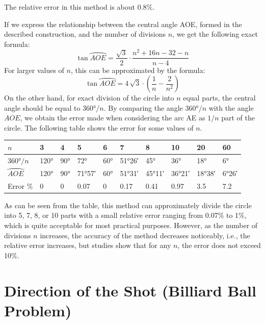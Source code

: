 The relative error in this method is about 0.8\%.


If we express the relationship between the central angle AOE, formed in the described construction, and the number of divisions \( n \), we get the following exact formula:
\begin{equation*}%
\tan \wideparen{AOE} = \frac{\sqrt{3}}{2} \cdot \frac{n^2 + 16n - 32 - n}{n - 4}
\end{equation*}
For larger values of \( n \), this can be approximated by the formula:
\begin{equation*}%
\tan \wideparen{AOE} = 4 \, \sqrt{3} \cdot \left(\frac{1}{n} - \frac{2}{n^2}\right)
\end{equation*}
On the other hand, for exact division of the circle into \( n \) equal parts, the central angle should be equal to \(\ang{360}/n \). By comparing the angle  \(\ang{360}/n \) with the angle $AOE$, we obtain the error made when considering the arc AE as \( 1/n \) part of the circle. The following table shows the error for some values of \( n \).

\begin{table}
\centering
\begin{small}
\begin{tabular}{p{1cm}lllllllll}
\toprule
$n$	& 3	& 4	& 5	& 6	& 7	& 8	& 10	 & 20 & 60 \\
\midrule
$\ang{360}/n$ &	\ang{120} & 	\ang{90} & 	\ang{72} & 	\ang{60} & 	\ang{51;26}	& \ang{45} & \ang{36} & \ang{18} & \ang{6}\\
$\wideparen{AOE}$	&	\ang{120} & 	\ang{90} & 	\ang{71;57} & 	\ang{60} & 	\ang{51;31}	& \ang{45;11} & \ang{36;21} & \ang{18;38} & \ang{6;26}\\
Error \% & 0 & 0 & 0.07 & 0 & 0.17 & 0.41 & 0.97 &  3.5 & 7.2 \\
\bottomrule
\end{tabular}
\end{small}
\end{table}

As can be seen from the table, this method can approximately divide the circle into 5, 7, 8, or 10 parts with a small relative error ranging from 0.07\% to 1\%, which is quite acceptable for most practical purposes. However, as the number of divisions \( n \) increases, the accuracy of the method decreases noticeably, i.e., the relative error increases, but studies show that for any \( n \), the error does not exceed 10\%.




\section[Billiard Ball Problem]{Direction of the Shot (Billiard Ball Problem)}
\label{sec-10.7}

